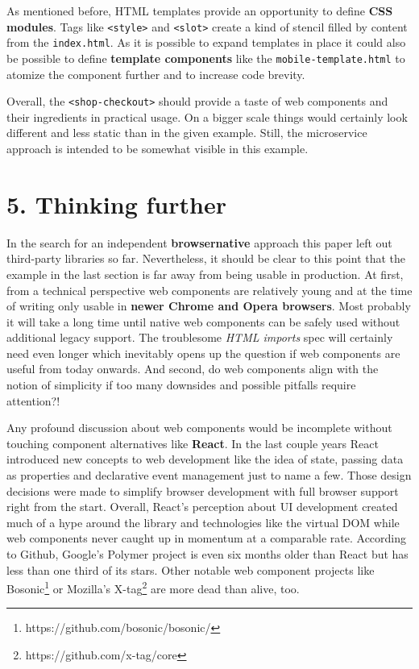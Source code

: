 \documentclass[]{article}
\begin{document}
As mentioned before, HTML templates provide an opportunity to define
\textbf{CSS modules}. Tags like \texttt{\textless{}style\textgreater{}}
and \texttt{\textless{}slot\textgreater{}} create a kind of stencil
filled by content from the \texttt{index.html}. As it is possible to
expand templates in place it could also be possible to define
\textbf{template components} like the \texttt{mobile-template.html} to
atomize the component further and to increase code brevity.

Overall, the \texttt{\textless{}shop-checkout\textgreater{}} should
provide a taste of web components and their ingredients in practical
usage. On a bigger scale things would certainly look different and less
static than in the given example. Still, the microservice approach is
intended to be somewhat visible in this example.

\section{5. Thinking further}\label{thinking-further}

In the search for an independent \textbf{browsernative} approach this
paper left out third-party libraries so far. Nevertheless, it should be
clear to this point that the example in the last section is far away
from being usable in production. At first, from a technical perspective
web components are relatively young and at the time of writing only
usable in \textbf{newer Chrome and Opera browsers}. Most probably it
will take a long time until native web components can be safely used
without additional legacy support. The troublesome \emph{HTML imports}
spec will certainly need even longer which inevitably opens up the
question if web components are useful from today onwards. And second, do
web components align with the notion of simplicity if too many downsides
and possible pitfalls require attention?!

Any profound discussion about web components would be incomplete without
touching component alternatives like \textbf{React}. In the last couple
years React introduced new concepts to web development like the idea of
state, passing data as properties and declarative event management just
to name a few. Those design decisions were made to simplify browser
development with full browser support right from the start. Overall,
React's perception about UI development created much of a hype around
the library and technologies like the virtual DOM while web components
never caught up in momentum at a comparable rate. According to Github,
Google's Polymer project is even six months older than React but has
less than one third of its stars. Other notable web component projects
like Bosonic\footnote{https://github.com/bosonic/bosonic/} or Mozilla's
X-tag\footnote{https://github.com/x-tag/core} are more dead than alive,
too.
\end{document}
